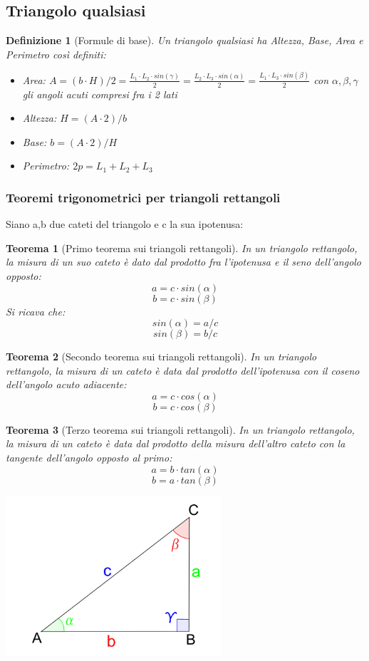\documentclass[12pt]{article}
\newenvironment{para}{\begin{adjustwidth}{13mm}{}}{\end{adjustwidth}}
\newtheorem{Definizione}{Definizione}[subsection]
\newtheorem{Teorema}{Teorema}[subsection]
\begin{document}
\begin{para}
\subsection{Triangolo qualsiasi}
\begin{Definizione}[Formule di base] Un triangolo qualsiasi ha Altezza, Base, Area e Perimetro così definiti: \begin{itemize}
    \item Area: $A = (b \cdot H)/2 = \frac{L_1\cdot L_2\cdot sin(\gamma)}{2} = \frac{L_2\cdot L_3\cdot sin(\alpha)}{2} = \frac{L_1\cdot L_3\cdot sin(\beta)}{2}$ con $\alpha, \beta, \gamma$ gli angoli acuti compresi fra i 2 lati
    \item Altezza: $H = (A \cdot 2)/b$
    \item Base: $b = (A \cdot 2)/H$
    \item Perimetro: $2p = L_1 + L_2 + L_3$
\end{itemize}
\end{Definizione}
\subsubsection{Teoremi trigonometrici per triangoli rettangoli}
Siano a,b due cateti del triangolo e c la sua ipotenusa:
\begin{Teorema}[Primo teorema sui triangoli rettangoli]
In un triangolo rettangolo, la misura di un suo cateto è dato dal prodotto fra l'ipotenusa e il seno dell'angolo opposto: $$a = c \cdot sin(\alpha)$$ $$b = c \cdot sin(\beta)$$
Si ricava che: $$sin(\alpha) = a/c$$ $$sin(\beta)= b/c$$
\end{Teorema}
\begin{Teorema}[Secondo teorema sui triangoli rettangoli]
In un triangolo rettangolo, la misura di un cateto è data dal prodotto dell'ipotenusa con il coseno dell'angolo acuto adiacente: $$a = c \cdot cos(\alpha)$$ $$b = c \cdot cos(\beta)$$
\end{Teorema}
\begin{Teorema}[Terzo teorema sui triangoli rettangoli]
In un triangolo rettangolo, la misura di un cateto è data dal prodotto della misura dell'altro cateto con la tangente dell'angolo opposto al primo: $$a = b \cdot tan(\alpha)$$ $$b = a \cdot tan(\beta)$$
\end{Teorema}
\begin{center}
    \includegraphics[width = 0.60\textwidth]{Immagini/Triangolo.PNG}
\end{center}

\end{para}
\end{document}
